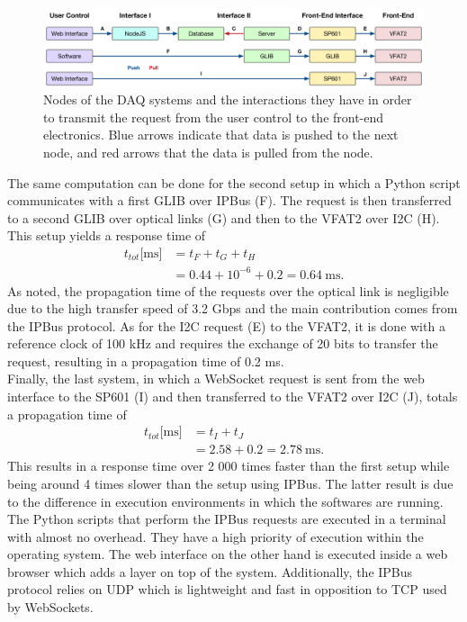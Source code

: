       \begin{figure}[t!]
        \centering
        \includegraphics[width=\textwidth]{img/III-2-web-daq/ctrl_req}
        \caption{Nodes of the DAQ systems and the interactions they have in order to transmit the request from the user control to the front-end electronics. Blue arrows indicate that data is pushed to the next node, and red arrows that the data is pulled from the node.}
        \label{fig:III-2-ctrl-req}
      \end{figure}

      The same computation can be done for the second setup in which a Python script communicates with a first GLIB over IPBus (F). The request is then transferred to a second GLIB over optical links (G) and then to the VFAT2 over I2C (H). This setup yields a response time of
      \begin{equation}
        \begin{split}
          t_{tot}\text{[ms]} & = t_F + t_G + t_H \\
                             & = 0.44 + 10^{-6} + 0.2 = 0.64 \ \text{ms}.
        \end{split}
      \end{equation}
      As noted, the propagation time of the requests over the optical link is negligible due to the high transfer speed of 3.2 Gbps and the main contribution comes from the IPBus protocol. As for the I2C request (E) to the VFAT2, it is done with a reference clock of 100 kHz and requires the exchange of 20 bits to transfer the request, resulting in a propagation time of 0.2 ms. \\

      Finally, the last system, in which a WebSocket request is sent from the web interface to the SP601 (I) and then transferred to the VFAT2 over I2C (J), totals a propagation time of
      \begin{equation}
        \begin{split}
          t_{tot}\text{[ms]} & = t_I + t_J \\
                             & = 2.58 + 0.2 = 2.78 \ \text{ms}.
        \end{split}
      \end{equation}
      This results in a response time over 2 000 times faster than the first setup while being around 4 times slower than the setup using IPBus. The latter result is due to the difference in execution environments in which the softwares are running. The Python scripts that perform the IPBus requests are executed in a terminal with almost no overhead. They have a high priority of execution within the operating system. The web interface on the other hand is executed inside a web browser which adds a layer on top of the system. Additionally, the IPBus protocol relies on UDP which is lightweight and fast in opposition to TCP used by WebSockets. \\

